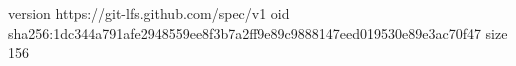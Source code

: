 version https://git-lfs.github.com/spec/v1
oid sha256:1dc344a791afe2948559ee8f3b7a2ff9e89c9888147eed019530e89e3ac70f47
size 156
